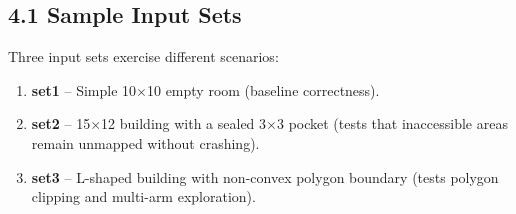 \documentclass[12pt,a4paper]{article}
\begin{document}
\subsection{4.1 Sample Input Sets}

Three input sets exercise different scenarios:

\begin{enumerate}[nosep]
\item \textbf{set1} -- Simple 10$\times$10 empty room (baseline correctness).
\item \textbf{set2} -- 15$\times$12 building with a sealed 3$\times$3 pocket
      (tests that inaccessible areas remain unmapped without crashing).
\item \textbf{set3} -- L-shaped building with non-convex polygon boundary
      (tests polygon clipping and multi-arm exploration).
\end{enumerate}
\end{document}
